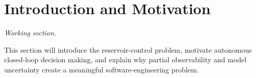 \section{Introduction and Motivation}
\label{sec:introduction}

\textit{Working section.}

This section will introduce the reservoir-control problem, motivate autonomous
closed-loop decision making, and explain why partial observability and model
uncertainty create a meaningful software-engineering problem.
